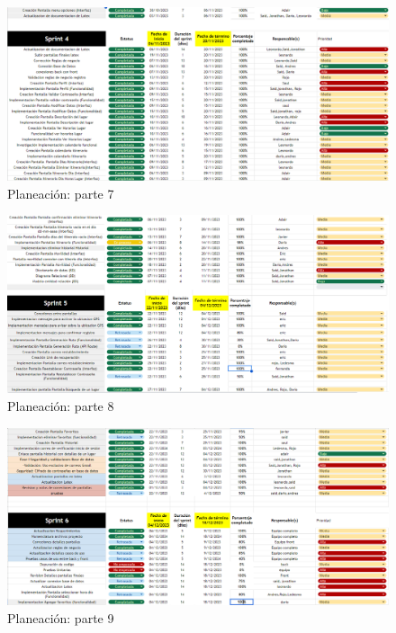 \begin{figure}[h]
    \centering
    \includegraphics[width=1\linewidth]{entregable final/UltimaPlaneacion/Captura de pantalla 2023-12-18 100533.png}
    \caption{Planeación: parte 7}
    \label{fig:Planeación parte 1}
\end{figure}
\begin{figure}[h]
    \centering
    \includegraphics[width=1\linewidth]{entregable final/UltimaPlaneacion/Captura de pantalla 2023-12-18 100613.png}
    \caption{Planeación: parte 8}
    \label{fig:Planeación parte 1}
\end{figure}
\begin{figure}[h]
    \centering
    \includegraphics[width=1\linewidth]{entregable final/UltimaPlaneacion/Captura de pantalla 2023-12-18 100750.png}
    \caption{Planeación: parte 9}
    \label{fig:Planeación parte 1}
\end{figure}

